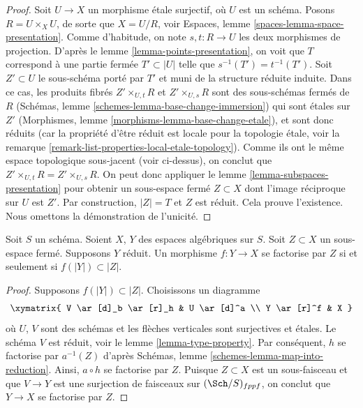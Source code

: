 \begin{proof}
Soit $U \to X$ un morphisme \'etale surjectif, où $U$ est un schéma.
Posons $R = U \times_X U$, de sorte que $X = U/R$, voir
Espaces, lemme \ref{spaces-lemma-space-presentation}.
Comme d'habitude, on note $s, t : R \to U$ les deux morphismes de projection.
D'après le lemme \ref{lemma-points-presentation},
on voit que $T$ correspond à une partie fermée $T' \subset |U|$ telle
que $s^{-1}(T') = t^{-1}(T')$.
Soit $Z' \subset U$ le sous-schéma porté par $T'$ et muni de la structure réduite induite.
Dans ce cas, les produits fibrés
$Z' \times_{U, t} R$ et $Z' \times_{U, s} R$ sont des sous-schémas fermés
de $R$
(Schémas, lemme \ref{schemes-lemma-base-change-immersion})
qui sont \'etales sur $Z'$
(Morphismes, lemme \ref{morphisms-lemma-base-change-etale}),
et sont donc réduits
(car la propriété d'être réduit est locale pour la topologie \'etale, voir la
remarque \ref{remark-list-properties-local-etale-topology}).
Comme ils ont le même espace topologique sous-jacent (voir ci-dessus),
on conclut que $Z' \times_{U, t} R = Z' \times_{U, s} R$.
On peut donc appliquer le lemme \ref{lemma-subspaces-presentation}
pour obtenir un sous-espace fermé $Z \subset X$ dont l'image réciproque sur $U$ est $Z'$.
Par construction, $|Z| = T$ et $Z$ est réduit. Cela prouve l'existence.
Nous omettons la démonstration de l'unicité.
\end{proof}

\begin{lemma}
\label{lemma-map-into-reduction}
Soit $S$ un schéma.
Soient $X$, $Y$ des espaces algébriques sur $S$.
Soit $Z \subset X$ un sous-espace fermé.
Supposons $Y$ réduit.
Un morphisme $f : Y \to X$ se factorise par $Z$ si et seulement si
$f(|Y|) \subset |Z|$.
\end{lemma}

\begin{proof}
Supposons $f(|Y|) \subset |Z|$. Choisissons un diagramme
$$
\xymatrix{
V \ar[d]_b \ar[r]_h & U \ar[d]^a \\
Y \ar[r]^f & X
}
$$
où $U$, $V$ sont des schémas et les flèches verticales sont surjectives et
\'etales. Le schéma $V$ est réduit, voir le
lemme \ref{lemma-type-property}.
Par conséquent, $h$ se factorise par $a^{-1}(Z)$ d'après
Schémas, lemme \ref{schemes-lemma-map-into-reduction}.
Ainsi, $a \circ h$ se factorise par $Z$.
Puisque $Z \subset X$ est un sous-faisceau et que $V \to Y$ est une surjection de faisceaux
sur $(\Sch/S)_{fppf}$, on conclut que $Y \to X$ se factorise
par $Z$.
\end{proof}

